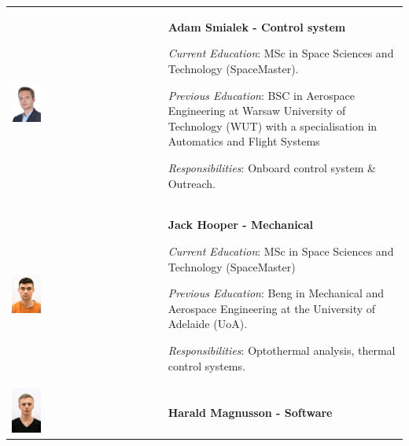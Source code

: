 \begin{longtable}[]{m{} m{}}
\includegraphics[width=0.2\textwidth]{0-cover/img/TEAMPICS/Adam_final.jpg}  & \textbf{Adam Smialek - Control system}

\smallskip
\textit{Current Education}: MSc in Space Sciences and Technology (SpaceMaster).

\smallskip
\textit{Previous Education}: BSC in Aerospace Engineering at Warsaw University of Technology (WUT) with a specialisation in Automatics and Flight Systems

\smallskip
\textit{Responsibilities}: Onboard control system \& Outreach.
\bigskip
\\

\includegraphics[width=0.2\textwidth]{0-cover/img/TEAMPICS/Jack_Final.jpg}  & \textbf{Jack Hooper - Mechanical}

\smallskip
\textit{Current Education}: MSc in Space Sciences and Technology (SpaceMaster)

\smallskip
\textit{Previous Education}: Beng in Mechanical and Aerospace Engineering at the University of Adelaide (UoA). 

\smallskip
\textit{Responsibilities}: Optothermal analysis, thermal control systems.
\bigskip
\\


\includegraphics[width=0.2\textwidth]{0-cover/img/TEAMPICS/Harald_final.jpg}  & \textbf{Harald Magnusson - Software}


\end{longtable}
